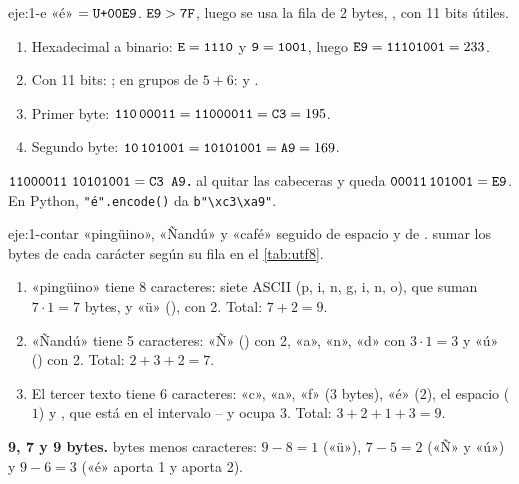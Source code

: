 \begin{solucion}{eje:1-e}
\datos «é» $=\texttt{U+00E9}$.
\planteamiento $\texttt{E9}>\texttt{7F}$, luego se usa la fila de 2 bytes, , con 11 bits útiles.
\pasos
\begin{enumerate}[label=\arabic*.]
  \item Hexadecimal a binario: $\texttt{E}=\texttt{1110}$ y $\texttt{9}=\texttt{1001}$, luego $\texttt{E9}=\texttt{11101001}=233$.
  \item Con 11 bits: ; en grupos de $5+6$:  y .
  \item Primer byte: $\texttt{110}\,\texttt{00011}=\texttt{11000011}=\texttt{C3}=195$.
  \item Segundo byte: $\texttt{10}\,\texttt{101001}=\texttt{10101001}=\texttt{A9}=169$.
\end{enumerate}
\resultado \textbf{$\bits{11000011}\ \bits{10101001}=\hx{C3 A9}$.}
\comprobacion al quitar las cabeceras  y  queda $\texttt{00011}\,\texttt{101001}=\texttt{E9}$. En Python, \texttt{"é".encode()} da \texttt{b"\textbackslash xc3\textbackslash xa9"}.
\end{solucion}

\begin{solucion}{eje:1-contar}
\datos «pingüino», «Ñandú» y «café» seguido de espacio y de .
\planteamiento sumar los bytes de cada carácter según su fila en el \cref{tab:utf8}.
\pasos
\begin{enumerate}[label=\arabic*.]
  \item «pingüino» tiene 8 caracteres: siete ASCII (p, i, n, g, i, n, o), que suman $7\cdot 1=7$ bytes, y «ü» (), con 2. Total: $7+2=9$.
  \item «Ñandú» tiene 5 caracteres: «Ñ» () con 2, «a», «n», «d» con $3\cdot 1=3$ y «ú» () con 2. Total: $2+3+2=7$.
  \item El tercer texto tiene 6 caracteres: «c», «a», «f» ($3$ bytes), «é» ($2$), el espacio ($1$) y , que está en el intervalo -- y ocupa $3$. Total: $3+2+1+3=9$.
\end{enumerate}
\resultado \textbf{9, 7 y 9 bytes.}
\comprobacion bytes menos caracteres: $9-8=1$ («ü»), $7-5=2$ («Ñ» y «ú») y $9-6=3$ («é» aporta 1 y  aporta 2).
\end{solucion}

